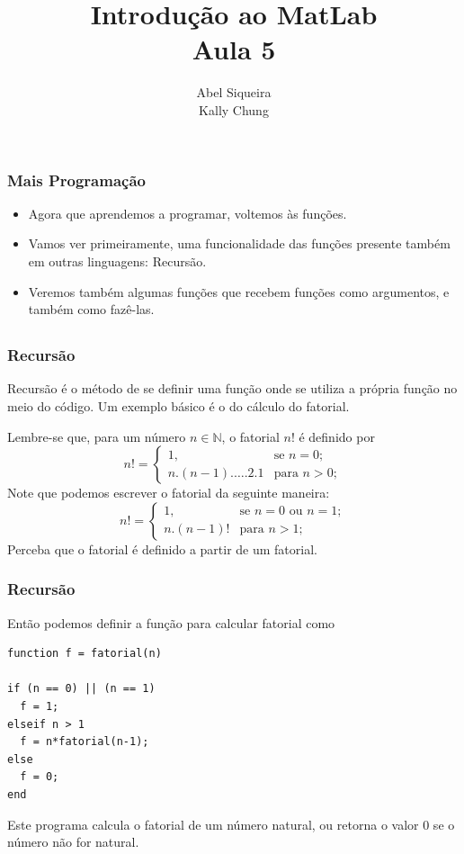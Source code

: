 \documentclass{beamer}
\title{Introdu\c{c}\~ao ao MatLab \\ Aula 5}
\author{Abel Siqueira \\ Kally Chung}
\date{}
\begin{document}
\frame{\titlepage}

\section[Mais Programa\c{c}\~ao]{}

\begin{frame}
\frametitle{Mais Programa\c{c}\~ao}

\begin{itemize}
\item<1-> Agora que aprendemos a programar, voltemos \`as fun\c{c}\~oes.
\item<2-> Vamos ver primeiramente, uma funcionalidade das fun\c{c}\~oes presente tamb\'em em outras linguagens: Recurs\~ao.
\item<3-> Veremos tamb\'em algumas fun\c{c}\~oes que recebem fun\c{c}\~oes como argumentos, e tamb\'em como faz\^e-las.
\end{itemize}

\end{frame}
\subsection[Recurs\~ao]{}

\begin{frame}
\frametitle{Recurs\~ao}

Recurs\~ao \'e o m\'etodo de se definir uma fun\c{c}\~ao onde se utiliza a pr\'opria fun\c{c}\~ao no meio do c\'odigo. \pause
Um exemplo b\'asico \'e o do c\'alculo do fatorial.
\pause

Lembre-se que, para um n\'umero $n \in \mathbb{N}$, o fatorial $n!$ \'e definido por
$$n! = \left\{
\begin{array}{cc}
1, & \mbox{se } n = 0; \\
n.(n-1).\dots.2.1 & \mbox{para } n > 0;
\end{array}
\right.$$
\pause
Note que podemos escrever o fatorial da seguinte maneira:
$$n! = \left\{
\begin{array}{cc}
1, & \mbox{se } n = 0 \mbox{ ou } n = 1; \\
n.(n-1)! & \mbox{para } n > 1;
\end{array}
\right.$$
\pause
Perceba que o fatorial \'e definido a partir de um fatorial.
\end{frame}

\begin{frame}[fragile]
\frametitle{Recurs\~ao}

Ent\~ao podemos definir a fun\c{c}\~ao para calcular fatorial como
\pause
\begin{verbatim}
function f = fatorial(n)

if (n == 0) || (n == 1)
  f = 1;
elseif n > 1
  f = n*fatorial(n-1);
else
  f = 0;
end
\end{verbatim}
\pause
Este programa calcula o fatorial de um n\'umero natural, ou retorna o valor 0 se o n\'umero n\~ao for natural.

\end{frame}
\end{document}
